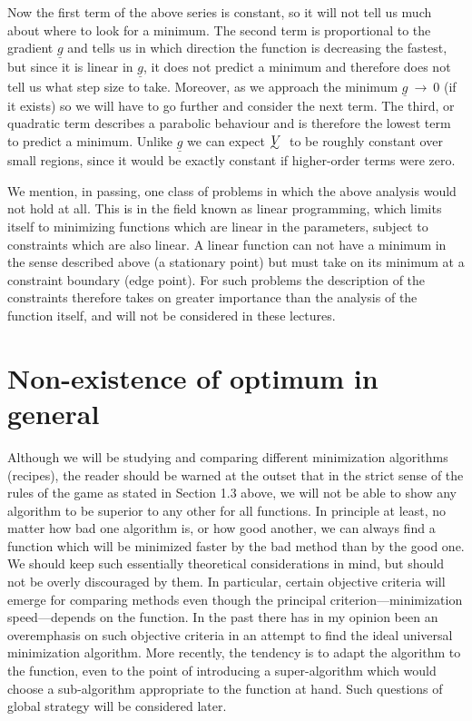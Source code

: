 Now the first term of the above series is constant, so it will not tell
us much about where to look for a minimum.  The second term is
proportional to the gradient  ${\underline{g}}$
and tells us in which direction the function is
decreasing the fastest, but since it is linear in ${\underline{g}}$, it does not predict
a minimum and therefore does not tell us what step size to take.
Moreover, as we approach the minimum ${\underline{g}}~\to~0$ (if it exists)
so we will have to
go further and consider the next term.  The third, or quadratic term
describes a parabolic behaviour and is therefore the lowest term to
predict a minimum.  Unlike ${\underline{g}}$ we can expect $\UTV$ to be roughly constant over
small regions, since it would be exactly constant if higher-order terms
were zero.
 
     We mention, in passing, one class of problems in which the above
analysis would not hold at all.  This is in the field known as linear
programming, which limits itself to minimizing functions which are linear
in the parameters, subject to constraints which are also linear.  A
linear function can not have a minimum in the sense described above (a
stationary point) but must take on its minimum at a constraint boundary
(edge point).  For such problems the description of the constraints therefore
takes on greater importance than the analysis of the function
itself, and will not be considered in these lectures.
 
 
\section{Non-existence of optimum in general}
 
     Although we will be studying and comparing
different minimization algorithms (recipes), the reader should be warned
at the outset that in the strict sense of the rules of the game as stated
in Section 1.3 above, we will not be able to show any algorithm to be
superior to any other for all functions.  In principle at least, no
matter how bad one algorithm is, or how good another, we can always find
a function which will be minimized faster by the bad method than by the
good one.  We should keep such essentially theoretical considerations in
mind, but should not be overly discouraged by them.  In particular,
certain objective criteria will emerge for comparing methods even though
the principal criterion---minimization speed---depends on the function.
In the past there has in my opinion been an overemphasis on such objective
criteria in an attempt to find the ideal universal minimization
algorithm.  More recently, the tendency is to adapt the algorithm to
the function, even to the point of introducing a super-algorithm which
would
choose a sub-algorithm appropriate to the function at hand. Such questions
of global strategy will be considered later.
 
